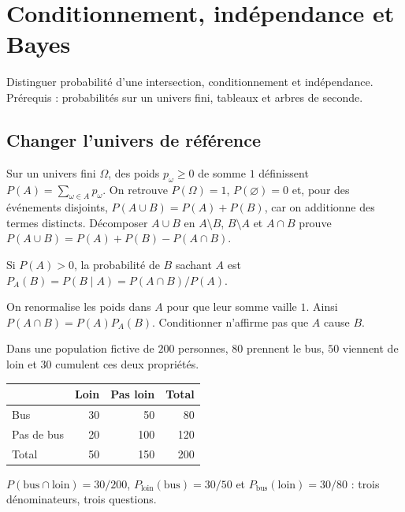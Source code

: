\documentclass[../cours_1re.tex]{subfiles}
\begin{document}
\setcounter{chapter}{18}
\chapter{Conditionnement, indépendance et Bayes}
\label{ch:19}
\begin{objectif}
Distinguer probabilité d'une intersection, conditionnement et indépendance.
Prérequis : probabilités sur un univers fini, tableaux et arbres de seconde.
\end{objectif}
\section{Changer l'univers de référence}
Sur un univers fini $\Omega$, des poids $p_\omega\ge0$ de somme $1$
définissent $P(A)=\sum_{\omega\in A}p_\omega$.
On retrouve $P(\Omega)=1$, $P(\varnothing)=0$ et, pour des événements disjoints,
$P(A\cup B)=P(A)+P(B)$, car on additionne des termes distincts.
Décomposer $A\cup B$ en $A\setminus B$, $B\setminus A$ et $A\cap B$
prouve $P(A\cup B)=P(A)+P(B)-P(A\cap B)$.
\begin{definition}
Si $P(A)>0$, la probabilité de $B$ sachant $A$ est
$P_A(B)=P(B\mid A)=P(A\cap B)/P(A)$.
\end{definition}
On renormalise les poids dans $A$ pour que leur somme vaille $1$.
Ainsi $P(A\cap B)=P(A)P_A(B)$.
Conditionner n'affirme pas que $A$ cause $B$.

\begin{exemple}
Dans une population fictive de $200$ personnes, $80$ prennent le bus,
$50$ viennent de loin et $30$ cumulent ces deux propriétés.
\begin{center}
\begin{tabular}{lrrr}
\toprule & Loin & Pas loin & Total\\\midrule
Bus &30&50&80\\
Pas de bus&20&100&120\\\midrule
Total&50&150&200\\\bottomrule
\end{tabular}
\end{center}
$P(\text{bus}\cap\text{loin})=30/200$,
$P_{\text{loin}}(\text{bus})=30/50$ et
$P_{\text{bus}}(\text{loin})=30/80$ : trois dénominateurs, trois questions.
\end{exemple}
\end{document}

